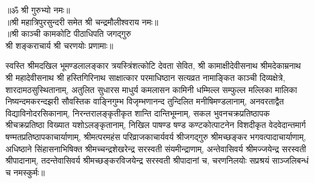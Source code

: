 \begin{center}
{॥ॐ श्री गुरुभ्यो नमः॥}\\
{॥श्री महात्रिपुरसुन्दरी समेत श्री चन्द्रमौलीश्वराय नमः॥}\\
{॥श्री काञ्ची कामकोटि पीठाधिपति जगद्गुरु\\ श्री शङ्कराचार्य श्री चरणयोः प्रणामाः॥}
\end{center}

\noindent स्वस्ति श्रीमदखिल भूमण्डलालङ्कार त्रयस्त्रिंशत्कोटि देवता सेवित, श्री कामाक्षीदेवीसनाथ श्रीमदेकाम्रनाथ श्री महादेवीसनाथ श्री हस्तिगिरिनाथ साक्षात्कार परमाधिष्ठान सत्यव्रत नामाङ्कित काञ्ची दिव्यक्षेत्रे, शारदामठसुस्थितानाम्, अतुलित सुधारस माधुर्य कमलासन कामिनी धम्मिल्ल सम्फुल्ल मल्लिका मालिका
निष्यन्दमकरन्दझरी सौवस्तिक वाङ्निगुम्भ विजृम्भणानन्द 
तुन्दिलित मनीषिमण्डलानाम्, अनवरताद्वैत विद्याविनोदरसिकानाम्, निरन्तरालङ्कृतीकृत शान्ति दान्तिभूम्नाम्, सकल भुवनचक्रप्रतिष्ठापक  श्रीचक्रप्रतिष्ठा विख्यात यशोऽलङ्कृतानाम्, निखिल पाषण्ड षण्ड कण्टकोत्पाटनेन विशदीकृत वेदवेदान्तमार्ग
षण्मत\-प्रतिष्ठापकाचार्याणाम्, श्रीमत्परमहंस परिव्राजकाचार्यवर्य श्रीजगद्गुरु श्रीमच्छङ्कर भगवत्पादाचार्याणाम्, अधिष्ठाने सिंहासनाभिषिक्त श्रीमच्चन्द्रशेखरेन्द्र सरस्वती संयमीन्द्राणाम्, अन्तेवासिवर्य श्रीमज्जयेन्द्र सरस्वती श्रीपादानाम्, तदन्तेवासिवर्य श्रीमच्छङ्करविजयेन्द्र सरस्वती श्रीपादानां च, चरणनिलयोः सप्रश्रयं साञ्जलिबन्धं च नमस्कुर्मः॥